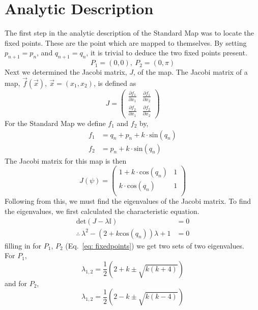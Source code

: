 \documentclass{article}
\begin{document}
\section{Analytic Description}
The first step in the analytic description of the Standard Map was to locate the fixed points. These are the point which are mapped to themselves. By setting $p_{n+1}=p_n$, and $q_{n+1}=q_n$, it is trivial to deduce the two fixed points present.
\begin{equation}\label{eq: fixedpoints}
P_1=(0,0), ~P_2=(0,\pi)
\end{equation}
\indent Next we determined the Jacobi matrix, $J$, of the map. The Jacobi matrix of a map, $\vec{f}(\vec{x}), ~\vec{x}=(x_1, x_2)$, is defined as
\begin{equation}
J=
\begin{pmatrix}
\frac{\partial f_1}{\partial x_1} & \frac{\partial f_1}{\partial x_2}\\
\frac{\partial f_2}{\partial x_1} & \frac{\partial f_2}{\partial x_2}
\end{pmatrix}
\end{equation}
For the Standard Map we define $f_1$ and $f_2$ by,
\begin{equation}
\begin{split}
f_1 & = q_n + p_n + k\cdot\mathrm{sin}(q_n)\\
f_2 &= p_n + k\cdot\mathrm{sin}(q_n)
\end{split}
\end{equation}
The Jacobi matrix for this map is then
\begin{equation}
J(\psi)=
\begin{pmatrix}
1 + k\cdot\mathrm{cos}(q_n) & 1\\
k\cdot\mathrm{cos}(q_n) & 1\\
\end{pmatrix}
\end{equation}
\indent Following from this, we must find the eigenvalues of the Jacobi matrix. To find the eigenvalues, we first calculated the characteristic equation.
\begin{equation}
\begin{split}
\mathrm{det}\left(J-\lambda\mathbb{I}\right)&=0\\
\therefore ~\lambda^2 - (2+k\mathrm{cos}(q_n))\lambda + 1&=0
\end{split}
\end{equation}
filling in for $P_1$, $P_2$ (Eq.~\ref{eq: fixedpoints}) we get two sets of two eigenvalues.\\
For $P_1$,
\begin{equation}\label{eq: fixed point 1 eigenvals}
\lambda_{1,2} = \frac{1}{2}\left(2+k\pm\sqrt{k(k+4)}\right)
\end{equation}
and for $P_2$,
\begin{equation}\label{eq: fixed point 2 eigenvals}
\lambda_{1,2} = \frac{1}{2}\left(2-k\pm\sqrt{k(k-4)}\right)
\end{equation}
\end{document}
